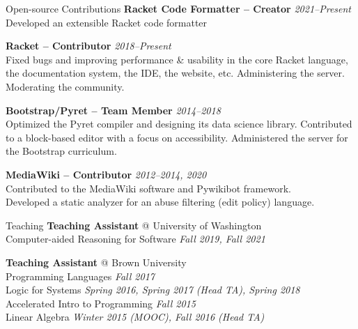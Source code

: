 \documentclass{resume} %
\begin{document}
\begin{rSection}{Open-source Contributions}
  {\bf Racket Code Formatter -- Creator} \hfill {\em 2021--Present}\\
  Developed an extensible Racket code formatter

  {\bf Racket -- Contributor} \hfill {\em 2018--Present}\\
  Fixed bugs and improving performance \& usability in the core Racket language, the documentation system, the IDE, the website, etc. Administering the server. Moderating the community.

  {\bf Bootstrap/Pyret -- Team Member} \hfill {\em 2014--2018}\\
  Optimized the Pyret compiler and designing its data science library. 
  Contributed to a block-based editor with a focus on accessibility.
  Administered the server for the Bootstrap curriculum.

  {\bf MediaWiki -- Contributor} \hfill {\em 2012--2014, 2020}\\
  Contributed to the MediaWiki software and Pywikibot framework.\\
  Developed a static analyzer for an abuse filtering (edit policy) language.
\end{rSection}

\begin{rSection}{Teaching}
  {\bf Teaching Assistant} @ University of Washington\\ 
  Computer-aided Reasoning for Software \hfill {\em Fall 2019, Fall 2021}

  {\bf Teaching Assistant} @ Brown University\\ 
  Programming Languages \hfill {\em Fall 2017}\\
  Logic for Systems \hfill {\em Spring 2016, Spring 2017 (Head TA), Spring 2018}\\
  Accelerated Intro to Programming \hfill {\em Fall 2015}\\
  Linear Algebra \hfill {\em Winter 2015 (MOOC), Fall 2016 (Head TA)}
\end{rSection}
\end{document}
